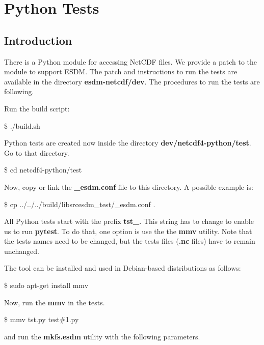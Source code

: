 \chapter{Python Tests}
\label{ch:python}

\section{Introduction}

There is a Python module for accessing NetCDF files.
We provide a patch to the module to support ESDM.
The patch and instructions to run the tests are available in the directory \textbf{esdm-netcdf/dev}.
The procedures to run the tests are following.

Run the build script:

\begin{framed}
\$ ./build.sh
\end{framed}

Python tests are created now inside the directory \textbf{dev/netcdf4-python/test}. Go to that directory.

\begin{framed}
\$ cd netcdf4-python/test
\end{framed}

Now, copy or link the \textbf{\_esdm.conf} file to this directory. A possible example is:

\begin{framed}
\$ cp ../../../build/libsrcesdm\_test/\_esdm.conf .
\end{framed}

All Python tests start with the prefix \textbf{tst\_}.
This string has to change to enable us to run \textbf{pytest}. To do that, one option is use the the \textbf{mmv} utility. Note that the tests names need to be changed, but the tests files (\textbf{.nc} files) have to remain unchanged.

The tool can be installed and used in Debian-based distributions as follows:

\begin{framed}
\$ sudo apt-get install mmv
\end{framed}

Now, run the \textbf{mmv} in the tests.

\begin{framed}
\$ mmv tst\*.py test\#1.py
\end{framed}

and run the \textbf{mkfs.esdm} utility with the following parameters.


